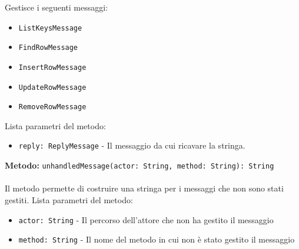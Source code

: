 \documentclass[a4paper]{article}
\begin{document}
			Gestisce i seguenti messaggi:
			\begin{itemize}
				\item \texttt{ListKeysMessage}
				\item \texttt{FindRowMessage}
				\item \texttt{InsertRowMessage}
				\item \texttt{UpdateRowMessage}
				\item \texttt{RemoveRowMessage}
			\end{itemize}
			Lista parametri del metodo:
			\begin{itemize}
				\item \texttt{reply: ReplyMessage} - Il messaggio da cui ricavare la stringa.
			\end{itemize}
		\textbf{Metodo: }\texttt{unhandledMessage(actor: String, method: String): String}
			\\ \\
			Il metodo permette di costruire una stringa per i messaggi che non sono stati gestiti.
			Lista parametri del metodo:
			\begin{itemize}
				\item \texttt{actor: String} - Il percorso dell'attore che non ha gestito il messaggio
				\item \texttt{method: String} - Il nome del metodo in cui non è stato gestito il messaggio
			\end{itemize}
			
\end{document}
